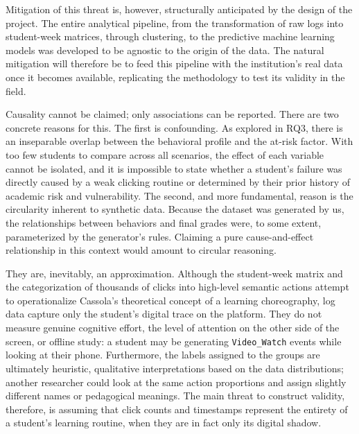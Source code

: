 Mitigation of this threat is, however, structurally anticipated by the design of the project. The entire analytical pipeline, from the transformation of raw logs into student-week matrices, through clustering, to the predictive machine learning models was developed to be agnostic to the origin of the data. The natural mitigation will therefore be to feed this pipeline with the institution's real data once it becomes available, replicating the methodology to test its validity in the field.

Causality cannot be claimed; only associations can be reported. There are two concrete reasons for this. The first is confounding. As explored in RQ3, there is an inseparable overlap between the behavioral profile and the at-risk factor. With too few students to compare across all scenarios, the effect of each variable cannot be isolated, and it is impossible to state whether a student's failure was directly caused by a weak clicking routine or determined by their prior history of academic risk and vulnerability. The second, and more fundamental, reason is the circularity inherent to synthetic data. Because the dataset was generated by us, the relationships between behaviors and final grades were, to some extent, parameterized by the generator's rules. Claiming a pure cause-and-effect relationship in this context would amount to circular reasoning.

They are, inevitably, an approximation. Although the student-week matrix and the categorization of thousands of clicks into high-level semantic actions attempt to operationalize Cassola's theoretical concept of a learning choreography, log data capture only the student's digital trace on the platform. They do not measure genuine cognitive effort, the level of attention on the other side of the screen, or offline study: a student may be generating \texttt{Video\_Watch} events while looking at their phone. Furthermore, the labels assigned to the groups are ultimately heuristic, qualitative interpretations based on the data distributions; another researcher could look at the same action proportions and assign slightly different names or pedagogical meanings. The main threat to construct validity, therefore, is assuming that click counts and timestamps represent the entirety of a student's learning routine, when they are in fact only its digital shadow.

